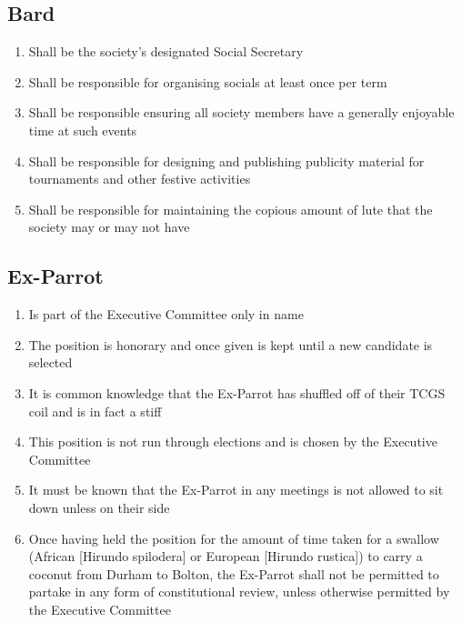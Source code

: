 \documentclass[hidelinks, 12pt, a4paper]{article}
\begin{document}
\subsection{Bard}
\begin{enumerate}
	\item Shall be the society’s designated Social Secretary
	\item Shall be responsible for organising socials at least once per term
	\item Shall be responsible ensuring all society members have a generally enjoyable time at such events
	\item Shall be responsible for designing and publishing publicity material for tournaments and other festive activities
	\item Shall be responsible for maintaining the copious amount of lute that the society may or may not have
\end{enumerate}

\subsection{Ex-Parrot}
\begin{enumerate}
	\item Is part of the Executive Committee only in name
	\item The position is honorary and once given is kept until a new candidate is selected
	\item It is common knowledge that the Ex-Parrot has shuffled off of their TCGS coil and is in fact a stiff
	\item This position is not run through elections and is chosen by the Executive Committee
	\item It must be known that the Ex-Parrot in any meetings is not allowed to sit down unless on their side
	\item Once having held the position for the amount of time taken for a swallow (African [Hirundo spilodera] or European [Hirundo rustica]) to carry a coconut from Durham to Bolton, the Ex-Parrot shall not be permitted to partake in any form of constitutional review, unless otherwise permitted by the Executive Committee
\end{enumerate}
\end{document}
